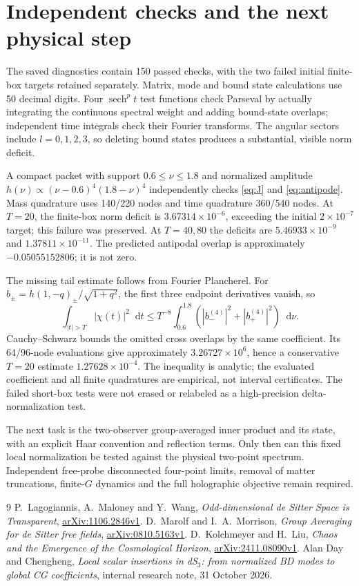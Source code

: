 \documentclass[11pt,a4paper]{article}
\newcommand{\dd}{\mathop{}\!\mathrm d}
\newcommand{\sech}{\operatorname{sech}}
\begin{document}
\section{Independent checks and the next physical step}
The saved diagnostics contain 150 passed checks, with the two failed
initial finite-box targets retained separately. Matrix, mode and bound
state calculations use 50 decimal digits. Four $\sech^p t$ test functions
check Parseval by actually integrating the continuous spectral weight
and adding bound-state overlaps; independent time integrals check their
Fourier transforms. The angular sectors include $l=0,1,2,3$, so deleting
bound states produces a substantial, visible norm deficit.

A compact packet with support $0.6\leq\nu\leq1.8$ and normalized amplitude
$h(\nu)\propto(\nu-0.6)^4(1.8-\nu)^4$ independently checks
\eqref{eq:J} and \eqref{eq:antipode}. Mass quadrature uses 140/220 nodes
and time quadrature 360/540 nodes. At $T=20$, the finite-box norm deficit
is $3.67314\times10^{-6}$, exceeding the initial $2\times10^{-7}$
target; this failure was preserved. At $T=40,80$ the deficits are
$5.46933\times10^{-9}$ and $1.37811\times10^{-11}$.
The predicted antipodal overlap is approximately $-0.05055152806$;
it is not zero.

The missing tail estimate follows from Fourier Plancherel.
For $b_\pm=h(1,-q)_\pm/\sqrt{1+q^2}$, the first three endpoint derivatives
vanish, so
\begin{equation}
 \int_{|t|>T}|\chi(t)|^2\dd t
 \leq T^{-8}\int_{0.6}^{1.8}
       (|b_-^{(4)}|^2+|b_+^{(4)}|^2)\dd\nu .
\end{equation}
Cauchy--Schwarz bounds the omitted cross overlaps by the same coefficient.
Its 64/96-node evaluations give approximately $3.26727\times10^6$,
hence a conservative $T=20$ estimate $1.27628\times10^{-4}$.
The inequality is analytic; the evaluated coefficient and all finite
quadratures are empirical, not interval certificates.
The failed short-box tests were not erased or relabeled as a
high-precision delta-normalization test.

The next task is the two-observer group-averaged inner product and its
state, with an explicit Haar convention and reflection terms.
Only then can this fixed local normalization be tested against the
physical two-point spectrum. Independent free-probe disconnected
four-point limits, removal of matter truncations, finite-$G$ dynamics
and the full holographic objective remain required.

\begin{thebibliography}{9}
 P.~Lagogiannis, A.~Maloney and Y.~Wang,
\emph{Odd-dimensional de Sitter Space is Transparent},
\href{https://arxiv.org/html/1106.2846v1}{arXiv:1106.2846v1}.
 D.~Marolf and I.~A.~Morrison,
\emph{Group Averaging for de Sitter free fields},
\href{https://arxiv.org/html/0810.5163v1}{arXiv:0810.5163v1}.
 D.~Kolchmeyer and H.~Liu,
\emph{Chaos and the Emergence of the Cosmological Horizon},
\href{https://arxiv.org/html/2411.08090v1}{arXiv:2411.08090v1}.
 Alan Day and Chengheng,
\emph{Local scalar insertions in dS$_3$: from normalized BD modes
to global CG coefficients}, internal research note, 31 October 2026.
\end{thebibliography}
\end{document}
